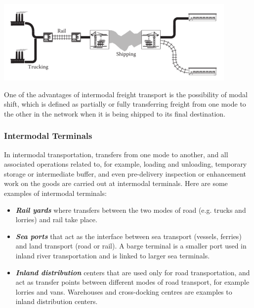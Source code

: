 \begin{center}
	\includegraphics{gfx/fig34.png}
\end{center}
One of the advantages of intermodal freight transport is the possibility of modal shift, which is defined as partially or fully transferring freight from one mode to the other in the network when it is being shipped to its final destination.
%
\subsubsection{Intermodal Terminals}
In intermodal transportation, transfers from one mode to another, and all associated operations related to, for example, loading and unloading, temporary storage or intermediate buffer, and even pre-delivery inspection or enhancement work on the goods are carried out at intermodal terminals. Here are some examples of intermodal terminals:
\begin{itemize}
	\item \textbf{\textit{Rail yards}} where transfers between the two modes of road (e.g. trucks and lorries) and rail take place.
	\item \textbf{\textit{Sea ports}} that act as the interface between sea transport (vessels, ferries) and land transport (road or rail). A barge terminal is a smaller port used in inland river transportation and is linked to larger sea terminals.
	\item \textbf{\textit{Inland distribution}} centers that are used only for road transportation, and act as transfer points between different modes of road transport, for example lorries and vans. Warehouses and cross-docking centres are examples to inland distribution centers.
\end{itemize}
%
